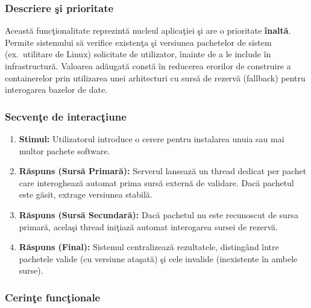 \documentclass[12pt, a4paper]{article}
\begin{document}
\subsubsection{Descriere \c{s}i prioritate}

Aceast\u{a} func\c{t}ionalitate reprezint\u{a} nucleul aplica\c{t}iei \c{s}i are o prioritate \textbf{înalt\u{a}}. Permite sistemului s\u{a}
verifice existen\c{t}a \c{s}i versiunea pachetelor de sistem (ex.\ utilitare de Linux) solicitate de utilizator,
\^{i}nainte de a le include \^{i}n infrastructur\u{a}. Valoarea ad\u{a}ugat\u{a} const\u{a} \^{i}n reducerea erorilor de construire
a containerelor prin utilizarea unei arhitecturi cu surs\u{a} de rezerv\u{a} (fallback) pentru interogarea bazelor
de date.

\subsubsection{Secven\c{t}e de interac\c{t}iune}

\begin{enumerate}
    \item \textbf{Stimul:} Utilizatorul introduce o cerere pentru instalarea unuia sau mai multor pachete
    software.
    \item \textbf{R\u{a}spuns (Surs\u{a} Primar\u{a}):} Serverul lanseaz\u{a} un thread dedicat per pachet care
    interogheaz\u{a} automat prima surs\u{a} extern\u{a} de validare. Dac\u{a} pachetul este g\u{a}sit, extrage versiunea
    stabil\u{a}.
    \item \textbf{R\u{a}spuns (Surs\u{a} Secundar\u{a}):} Dac\u{a} pachetul nu este recunoscut de sursa primar\u{a},
    acela\c{s}i thread ini\c{t}iaz\u{a} automat interogarea sursei de rezerv\u{a}.
    \item \textbf{R\u{a}spuns (Final):} Sistemul centralizeaz\u{a} rezultatele, distingând \^{i}ntre pachetele valide
    (cu versiune ata\c{s}at\u{a}) \c{s}i cele invalide (inexistente \^{i}n ambele surse).
\end{enumerate}

\subsubsection{Cerin\c{t}e func\c{t}ionale}
\end{document}
